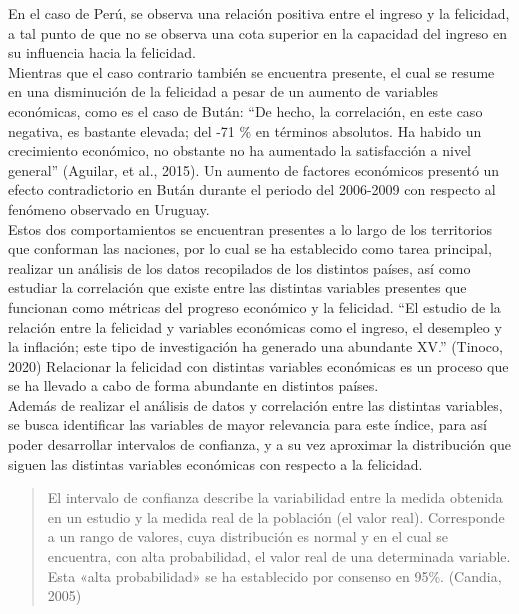 En el caso de Perú, se observa una relación positiva entre el ingreso y la felicidad, a tal punto de que no se observa una cota superior en la capacidad del ingreso en su influencia hacia la felicidad.\\
    
Mientras que el caso contrario también se encuentra presente, el cual se resume en una disminución de la felicidad a pesar de un aumento de variables económicas, como es el caso de Bután:  ``De hecho, la correlación, en este caso negativa, es bastante elevada; del -71 \% en términos absolutos. Ha habido un crecimiento económico, no obstante no ha aumentado la satisfacción a nivel general'' (Aguilar, et al., 2015). Un aumento de factores económicos presentó un efecto contradictorio en Bután durante el periodo del 2006-2009 con respecto al fenómeno observado en Uruguay.\\

Estos dos comportamientos se encuentran presentes a lo largo de los territorios que conforman las naciones, por lo cual se ha establecido como tarea principal, realizar un análisis de los datos recopilados de los distintos países, así como estudiar la correlación que existe entre las distintas variables presentes que funcionan como métricas del progreso económico y la felicidad. ``El estudio de la relación entre la felicidad y variables económicas como el ingreso, el desempleo y la inflación; este tipo de investigación ha generado una abundante XV.'' (Tinoco, 2020) Relacionar la felicidad con distintas variables económicas es un proceso que se ha llevado a cabo de forma abundante en distintos países.\\
    
Además de realizar el análisis de datos y correlación entre las distintas variables, se busca identificar las variables de mayor relevancia para este índice, para así poder desarrollar intervalos de confianza, y a su vez aproximar la distribución que siguen las distintas variables económicas con respecto a la felicidad.

\begin{quote}
    El intervalo de confianza describe la variabilidad entre la medida obtenida en un estudio y la medida real de la población (el valor real). Corresponde a un rango de valores, cuya distribución es normal y en el cual se encuentra, con alta probabilidad, el valor real de una determinada variable. Esta «alta probabilidad» se ha establecido por consenso en 95\%.
    \flushright (Candia, 2005)
\end{quote}

